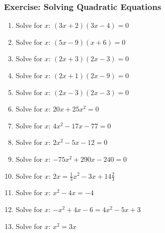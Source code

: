             \subsubsection{Exercise:  Solving Quadratic Equations }
            \nopagebreak
        \label{m39247*id153332}\begin{enumerate}[noitemsep, label=\textbf{\arabic*}. ] 
            \label{m39247*uid44}\item Solve for $x$: $\left(3x+2\right)\left(3x-4\right)=0$\hspace{1ex}        
\label{m39247*uid45}\item Solve for $x$: $\left(5x-9\right)\left(x+6\right)=0$\hspace{1ex}        
\label{m39247*uid46}\item Solve for $x$: $\left(2x+3\right)\left(2x-3\right)=0$\hspace{1ex}        
\label{m39247*uid47}\item Solve for $x$: $\left(2x+1\right)\left(2x-9\right)=0$\hspace{1ex}        
\label{m39247*uid48}\item Solve for $x$: $\left(2x-3\right)\left(2x-3\right)=0$\hspace{1ex}        
\label{m39247*uid49}\item Solve for $x$: $20x+25{x}^{2}=0$\hspace{1ex}        
\label{m39247*uid50}\item Solve for $x$: $4{x}^{2}-17x-77=0$\hspace{1ex}        
\label{m39247*uid51}\item Solve for $x$: $2{x}^{2}-5x-12=0$  \hspace{1ex}        
\label{m39247*uid52}\item Solve for $x$: $-75{x}^{2}+290x-240=0$\hspace{1ex}        
\label{m39247*uid53}\item Solve for $x$: $2x=\frac{1}{3}{x}^{2}-3x+14\frac{2}{3}$\hspace{1ex}        
\label{m39247*uid54}\item Solve for $x$: ${x}^{2}-4x=-4$\hspace{1ex}        
\label{m39247*uid55}\item Solve for $x$: $-{x}^{2}+4x-6=4{x}^{2}-5x+3$\hspace{1ex}        
\label{m39247*uid56}\item Solve for $x$: ${x}^{2}=3x$\hspace{1ex}        

\end{enumerate}
